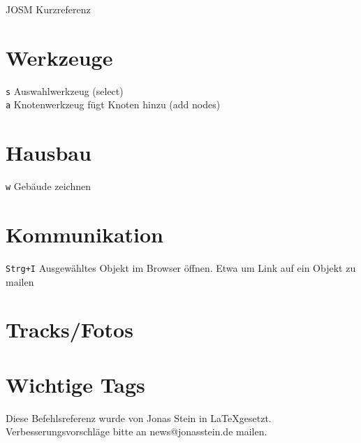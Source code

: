 \documentclass[a4paper,11pt,notumble]{leaflet}
\newcommand{\Key}[2]{{\tt #1} {#2}\\[2mm]}
\begin{document}
 
{\Huge JOSM Kurzreferenz}

\section*{Werkzeuge}
\Key{s}{Auswahlwerkzeug (select)}
\Key{a}{Knotenwerkzeug fügt Knoten hinzu (add nodes)}

\section*{Hausbau}
\Key{w}{Gebäude zeichnen}

\section*{Kommunikation}
\Key{Strg+I}{Ausgewähltes Objekt im Browser öffnen. Etwa um Link auf ein Objekt zu mailen}

\section*{Tracks/Fotos}



\newpage
\section*{Wichtige Tags}

\newpage
Diese Befehlsreferenz wurde von Jonas Stein in \LaTeX gesetzt.
Verbesserungsvorschläge bitte an news@jonasstein.de mailen.
\end{document}
